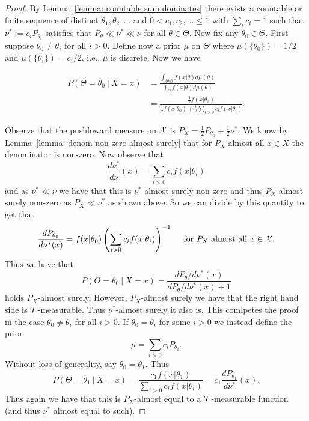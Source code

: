 \documentclass[twoside, a4paper, 10pt]{amsart}
\begin{document}
\begin{proof} By Lemma~\ref{lemma: countable sum dominates} there exists a countable or finite sequence of distinct $\theta_1, \theta_2,\ldots $ and $0<c_1,c_2, \ldots \leq 1$ with $\sum_{i} c_i=1$ such that $\nu^* := c_i P_{\theta_i}$ satisfies that $P_{\theta} \ll \nu^* \ll \nu$ for all $\theta \in \Theta$. Now fix any $\theta_0 \in \Theta$. First suppose $\theta_0 \neq \theta_i$ for all $i>0$. Define now a prior $\mu$ on $\Theta$ where $\mu(\{\theta_0\}) = 1/2$ and $\mu(\{\theta_i\}) = c_i/2$, i.e., $\mu$ is discrete.  Now we have

\begin{align*} P(\Theta = \theta_0 ~|~ X=x) &= \frac{\int_{\{\theta_0\}} f(x|\theta) d\mu(\theta)}{\int_{\Theta} f(x|\theta) d\mu(\theta)} \\
&= \frac{\frac{1}{2} f(x|\theta_0) }{\frac{1}{2} f(x|\theta_0) + \frac{1}{2} \sum_{i>0} c_i f(x|\theta_i)}. \end{align*}

Observe that the pushfoward measure on $\mathcal{X}$ is $P_X = \frac{1}{2}P_{\theta_0} + \frac{1}{2} \nu^* $. We know by Lemma~\ref{lemma: denom non-zero almost surely} that for $P_X$-almost all $x \in X$ the denominator is non-zero. Now observe that $$\frac{d\nu^*}{d\nu} (x)= \sum_{i>0} c_i f(x|\theta_i)$$ and as $\nu^* \ll \nu$ we have that this is $\nu^*$ almost surely non-zero and thus $P_X$-almost surely non-zero as $P_X \ll \nu^*$ as shown above. So we can divide by this quantity to get that \begin{align}\label{eq: dP/dnu-star}\frac{dP_{\theta_0}}{d\nu^*(x)} = f(x|\theta_0)\left(\sum_{i>0} c_i f(x|\theta_i) \right)^{-1} \quad\text{ for $P_X$-almost all $x \in \mathcal{X}$}. \end{align} Thus we have that $$P(\Theta = \theta_0 ~|~X=x) = \frac{dP_{\theta}/d\nu^*(x)}{dP_{\theta}/d\nu^*(x) + 1} $$ holds $P_X$-almost surely. However, $P_X$-almost surely we have that the right hand side is $\mathcal{T}$-measurable. Thus $\nu^*$-almost surely it also is. This comlpetes the proof in the case $\theta_0 \neq \theta_i$ for all $i>0$. If $\theta_0 = \theta_i$ for some $i>0$ we instead define the prior $$\mu = \sum_{i>0} c_i P_{\theta_i}.$$ Without loss of generality, say $\theta_0 = \theta_1$. Thus $$P(\Theta = \theta_1 ~|~ X=x) = \frac{c_1 f(x|\theta_1)}{\sum_{i>0} c_i f(x|\theta_i)} = c_1 \frac{dP_{\theta_1}}{d\nu^*}(x).$$ Thus again we have that this is $P_X$-almost equal to a $\mathcal{T}$-measurable function (and thus $\nu^*$ almost equal to such).

\end{proof}
\end{document}
